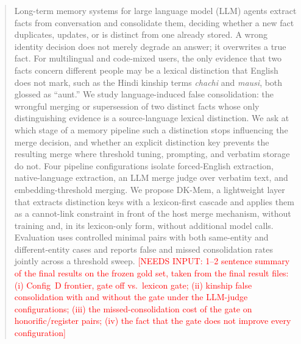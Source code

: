 \documentclass[conference]{IEEEtran}
\newcommand{\pending}[1]{\textcolor{red}{#1}}
\begin{document}
\begin{abstract}
Long-term memory systems for large language model (LLM) agents extract
facts from conversation and consolidate them, deciding whether a new fact
duplicates, updates, or is distinct from one already stored. A wrong
identity decision does not merely degrade an answer; it overwrites a true
fact. For multilingual and code-mixed users, the only evidence that two
facts concern different people may be a lexical distinction that English
does not mark, such as the Hindi kinship terms \textit{chachi} and
\textit{mausi}, both glossed as ``aunt.'' We study language-induced false
consolidation: the wrongful merging or supersession of two distinct facts
whose only distinguishing evidence is a source-language lexical
distinction. We ask at which stage of a memory pipeline such a distinction
stops influencing the merge decision, and whether an explicit distinction
key prevents the resulting merge where threshold tuning, prompting, and
verbatim storage do not. Four pipeline configurations isolate
forced-English extraction, native-language extraction, an LLM merge
judge over verbatim text, and embedding-threshold merging. We propose DK-Mem, a
lightweight layer that extracts distinction keys with a lexicon-first
cascade and applies them as a cannot-link constraint in front of the host
merge mechanism, without training and, in its lexicon-only form, without
additional model calls. Evaluation uses controlled minimal pairs with both
same-entity and different-entity cases and reports false and missed
consolidation rates jointly across a threshold sweep.
\pending{[NEEDS INPUT: 1--2 sentence summary of the final results on the
frozen gold set, taken from the final result files: (i) Config~D frontier,
gate off vs.\ lexicon gate; (ii) kinship false consolidation with and
without the gate under the LLM-judge configurations; (iii) the
missed-consolidation cost of the gate on honorific/register pairs; (iv) the
fact that the gate does not improve every configuration]}
\end{abstract}
\end{document}
